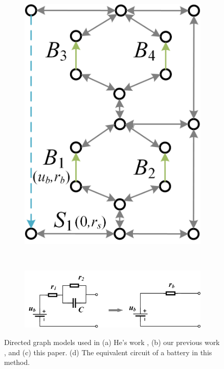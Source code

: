 \documentclass{article}
\begin{document}
\begin{figure}[htbp]
\begin{subfigure}[b]{0.24\textwidth}
        \includegraphics[width=\textwidth]{../attachments/direct-graph-my.png}
        \caption{}
        \label{fig:direct-graph-my}
    \end{subfigure}
    \\
    \begin{subfigure}[b]{0.8\textwidth}
        \includegraphics[width=\textwidth]{../attachments/battery_simple.png}
        \caption{}
        \label{fig:battery_simple}
    \end{subfigure}
    \caption{ 
        Directed graph models used in (a) He's work \cite{heExploringAdaptiveReconfiguration2013}, (b) our previous work , and (c) this paper.
        (d) The equivalent circuit of a battery in this method.
    }
\end{figure}
\end{document}
